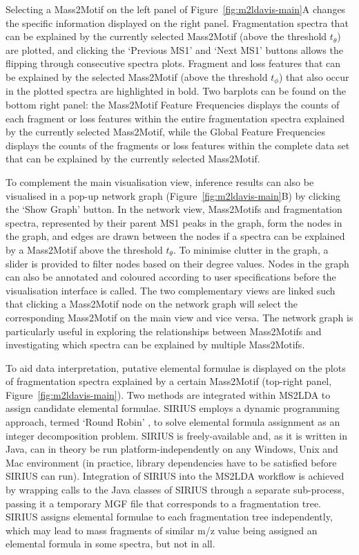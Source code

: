 Selecting a Mass2Motif on the left panel of Figure~\ref{fig:m2ldavis-main}A changes the specific information displayed on the right panel. Fragmentation spectra that can be explained by the currently selected Mass2Motif (above the threshold $t_{\theta}$) are plotted, and clicking the ‘Previous MS1’ and ‘Next MS1’ buttons allows the flipping through consecutive spectra plots. Fragment and loss features that can be explained by the selected Mass2Motif (above the threshold $t_{\phi}$) that also occur in the plotted spectra are highlighted in bold. Two barplots can be found on the bottom right panel: the Mass2Motif Feature Frequencies displays the counts of each fragment or loss features within the entire fragmentation spectra explained by the currently selected Mass2Motif, while the Global Feature Frequencies displays the counts of the fragments or loss features within the complete data set that can be explained by the currently selected Mass2Motif.

To complement the main visualisation view, inference results can also be visualised in a pop-up network graph (Figure~\ref{fig:m2ldavis-main}B) by clicking the ‘Show Graph’ button. In the network view, Mass2Motifs and fragmentation spectra, represented by their parent MS1 peaks in the graph, form the nodes in the graph, and edges are drawn between the nodes if a spectra can be explained by a Mass2Motif above the threshold $t_{\theta}$. To minimise clutter in the graph, a slider is provided to filter nodes based on their degree values. Nodes in the graph can also be annotated and coloured according to user specifications before the visualisation interface is called. The two complementary views are linked such that clicking a Mass2Motif node on the network graph will select the corresponding Mass2Motif on the main view and vice versa. The network graph is particularly useful in exploring the relationships between Mass2Motifs and investigating which spectra can be explained by multiple Mass2Motifs.

To aid data interpretation, putative elemental formulae is displayed on the plots of fragmentation spectra explained by a certain Mass2Motif (top-right panel, Figure~\ref{fig:m2ldavis-main}). Two methods are integrated within MS2LDA to assign candidate elemental formulae. SIRIUS \cite{Bocker2009} employs a dynamic programming approach, termed `Round Robin' \cite{Bocker2007}, to solve elemental formula assignment as an integer decomposition problem. SIRIUS is freely-available and, as it is written in Java, can in theory be run platform-independently on any Windows, Unix and Mac environment (in practice, library dependencies have to be satisfied before SIRIUS can run). Integration of SIRIUS into the MS2LDA workflow is achieved by wrapping calls to the Java classes of SIRIUS through a separate sub-process, passing it a temporary MGF file that corresponds to a fragmentation tree. SIRIUS assigns elemental formulae to each fragmentation tree independently, which may lead to mass fragments of similar m/z value being assigned an elemental formula in some spectra, but not in all.

